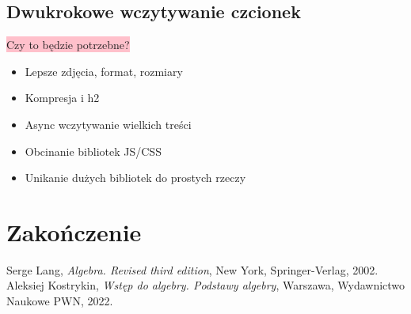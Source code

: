 \documentclass[licencjacka]{pracadypl}
\newcommand{\selfnote}[1]{\colorbox{pink}{#1}}
\begin{document}
\section{Dwukrokowe wczytywanie czcionek}
\selfnote{Czy to będzie potrzebne?}


\vspace{5em}

\begin{itemize}
  \item Lepsze zdjęcia, format, rozmiary
  \item Kompresja i h2
  \item Async wczytywanie wielkich treści
  \item Obcinanie bibliotek JS/CSS
  \item Unikanie dużych bibliotek do prostych rzeczy
\end{itemize}


\chapter{Zakończenie}


\begin{thebibliography}{7}
%
Serge Lang, 
\textit{Algebra. Revised third edition}, 
New York, Springer-Verlag, 2002.
%
Aleksiej Kostrykin, 
\textit{Wstęp do algebry. Podstawy algebry},
Warszawa, Wydawnictwo Naukowe PWN, 2022.
\end{thebibliography}
\end{document}
